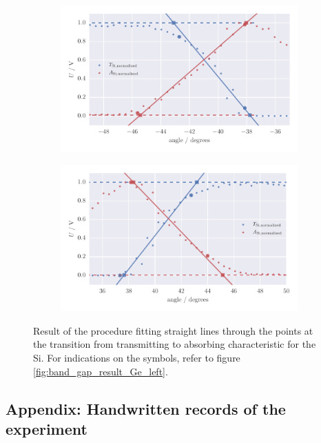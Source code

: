 \begin{figure}
    \centering
    \begin{subfigure}[b]{\pltw}
        \includegraphics[width=1.0\linewidth]{figures/band_gap_result_Si_left}
        \caption{}
        \label{fig:band_gap_result_Si_left}
    \end{subfigure}
    \begin{subfigure}[b]{\pltw}
        \includegraphics[width=1.0\linewidth]{figures/band_gap_result_Si_right}
        \caption{}
        \label{fig:band_gap_result_Si_right}
    \end{subfigure}
    \caption{
        Result of the procedure fitting straight lines through the points 
        at the transition from transmitting to absorbing characteristic
        for the Si.
        For indications on the symbols, refer to figure 
        \ref{fig:band_gap_result_Ge_left}. 
        }
    \label{fig:band_gap_result_Si}
\end{figure}


\subsection{Appendix: Handwritten records of the experiment}
    \label{sec:records_band_gap}
\clearpage

